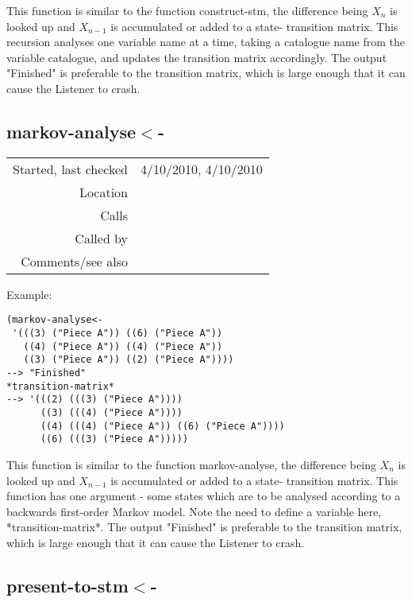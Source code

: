 \noindent This function is similar to the function
construct-stm, the difference being $X_n$ is looked
up and $X_{n-1}$ is accumulated or added to a state-
transition matrix. This recursion analyses one
variable name at a time, taking a catalogue name from
the variable catalogue, and updates the transition
matrix accordingly. The output "Finished" is
preferable to the transition matrix, which is large
enough that it can cause the Listener to crash.


\subsection*{markov-analyse$<$-}\label{fun:markov-analyse<-}

\vspace{0.3cm}
\begin{tabular}{r|p{8cm}}
Started, last checked & 4/10/2010, 4/10/2010 \\
Location & \nameref{sec:markov-analyse-backwards} \\
Calls & \nameref{fun:update-stm<-} \\
Called by & \nameref{fun:construct-stm<-} \\
Comments/see also & \nameref{fun:markov-analyse}
\end{tabular}

\vspace{0.5cm}
\noindent Example:
\begin{verbatim}
(markov-analyse<-
 '(((3) ("Piece A")) ((6) ("Piece A"))
   ((4) ("Piece A")) ((4) ("Piece A"))
   ((3) ("Piece A")) ((2) ("Piece A"))))
--> "Finished"
*transition-matrix*
--> '(((2) (((3) ("Piece A"))))
      ((3) (((4) ("Piece A"))))
      ((4) (((4) ("Piece A")) ((6) ("Piece A"))))
      ((6) (((3) ("Piece A")))))
\end{verbatim}

\noindent This function is similar to the function
markov-analyse, the difference being $X_n$ is looked
up and $X_{n-1}$ is accumulated or added to a state-
transition matrix. This function has one argument -
some states which are to be analysed according to a
backwards first-order Markov model. Note the need to
define a variable here, *transition-matrix*. The
output "Finished" is preferable to the transition
matrix, which is large enough that it can cause the
Listener to crash.


\subsection*{present-to-stm$<$-}\label{fun:present-to-stm<-}

